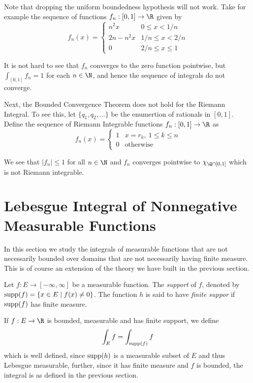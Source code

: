 Note that dropping the uniform boundedness hypothesis will not work. Take for example the sequence of functions $f_n:[0,1]\to\R$ given by 
\begin{equation*}
    f_n(x) = 
    \begin{cases}
        n^2x & 0\le x < 1/n\\
        2n - n^2x & 1/n\le x < 2/n\\
        0 & 2/n\le x\le 1
    \end{cases}
\end{equation*}

It is not hard to see that $f_n$ converges to the zero function pointwise, but $\int_{[0,1]} f_n = 1$ for each $n\in\N$, and hence the sequence of integrals do not converge.

Next, the Bounded Convergence Theorem does not hold for the Riemann Integral. To see this, let $\{q_1,q_2,\ldots\}$ be the enumertion of rationals in $[0,1]$. Define the sequence of Riemann Integrable functions $f_n: [0,1]\to\R$ as 
\begin{equation*}
    f_n(x) = 
    \begin{cases}
        1 &  x = r_k,~1\le k\le n\\
        0 & \text{otherwise}
    \end{cases}
\end{equation*}

We see that $|f_n|\le 1$ for all $n\in\N$ and $f_n$ converges pointwise to $\chi_{\Q\cap[0,1]}$ which is not Riemann integrable. 

\section{Lebesgue Integral of Nonnegative Measurable Functions}

In this section we study the integrals of measurable functions that are not necessarily bounded over domains that are not necessarily having finite measure. This is of course an extension of the theory we have built in the previous section.

\begin{definition}[Support]
    Let $f: E\to[-\infty,\infty]$ be a measurable function. The \textit{support} of $f$, denoted by $\operatorname{supp}(f) = \{x\in E\mid f(x)\ne 0\}$. The function $h$ is said to have \textit{finite suppor} if $\operatorname{supp}(f)$ has finite measure.
\end{definition}

If $f: E\to\R$ is bounded, measurable and has finite support, we define 
\begin{equation*}
    \int_E f = \int_{\operatorname{supp}(f)}f
\end{equation*}
which is well defined, since $\operatorname{supp}(h)$ is a measurable subset of $E$ and thus Lebesgue measurable, further, since it has finite measure and $f$ is bounded, the integral is as defined in the previous section.

